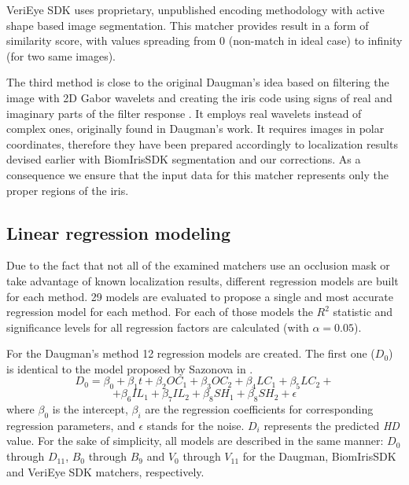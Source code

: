 \documentclass{article}
\begin{document}
VeriEye SDK uses proprietary, unpublished encoding methodology with active shape based image segmentation. This matcher provides result in a form of similarity score, with values spreading from 0 (non-match in ideal case) to infinity (for two same images).

The third method is close to the original Daugman's idea based on filtering the image with 2D Gabor wavelets and creating the iris code using signs of real and imaginary parts of the filter response \cite{DaugmanArticle}. It employs real wavelets instead of complex ones, originally found in Daugman's work. It requires images in polar coordinates, therefore they have been prepared accordingly to localization results devised earlier with BiomIrisSDK segmentation and our corrections. As a consequence we ensure that the input data for this matcher represents only the proper regions of the iris.

\subsection{Linear regression modeling}
Due to the fact that not all of the examined matchers use an occlusion mask or take advantage of known localization results, different regression models are built for each method. 29 models are evaluated to propose a single and most accurate regression model for each method. For each of those models the $R^2$ statistic and significance levels for all regression factors are calculated (with $\alpha=0.05$).

For the Daugman's method 12 regression models are created. The first one ($D_{0}$) is identical to the model proposed by Sazonova in \cite{Sazonova}.
$$D_0 = \beta_0 + \beta_{1}t + \beta_{2}OC_{1} + \beta_{3}OC_{2} + \beta_{4}LC_{1} + \beta_{5}LC_{2} +$$
$$ + \beta_{6}IL_{1} + \beta_{7}IL_{2} + \beta_{8}SH_{1} + \beta_{8}SH_{2} + \epsilon$$
where $\beta_0$ is the intercept, $\beta_{i}$ are the regression coefficients for corresponding regression parameters, and $\epsilon$ stands for the noise. $D_{i}$ represents the predicted \emph{HD} value. For the sake of simplicity, all models are described in the same manner: $D_0$ through $D_{11}$, $B_0$ through $B_9$ and $V_0$ through $V_{11}$ for the Daugman, BiomIrisSDK and VeriEye SDK matchers, respectively.
\end{document}
